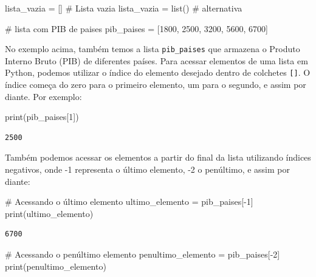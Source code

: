 \documentclass[
  portuguese,
  letterpaper,
  DIV=11,
  numbers=noendperiod]{scrreprt}
\newenvironment{Shaded}{\begin{snugshade}}{\end{snugshade}}
\newcommand{\BuiltInTok}[1]{\textcolor[rgb]{0.00,0.23,0.31}{#1}}
\newcommand{\CommentTok}[1]{\textcolor[rgb]{0.37,0.37,0.37}{#1}}
\newcommand{\DecValTok}[1]{\textcolor[rgb]{0.68,0.00,0.00}{#1}}
\newcommand{\NormalTok}[1]{\textcolor[rgb]{0.00,0.23,0.31}{#1}}
\newcommand{\OperatorTok}[1]{\textcolor[rgb]{0.37,0.37,0.37}{#1}}
\theoremstyle{definition}
\theoremstyle{remark}
\begin{document}
\begin{Shaded}
\begin{Highlighting}[]
\NormalTok{lista\_vazia }\OperatorTok{=}\NormalTok{ [] }\CommentTok{\# Lista vazia}
\NormalTok{lista\_vazia }\OperatorTok{=} \BuiltInTok{list}\NormalTok{() }\CommentTok{\# alternativa}

\CommentTok{\# lista com PIB de paises}
\NormalTok{pib\_paises }\OperatorTok{=}\NormalTok{ [}\DecValTok{1800}\NormalTok{, }\DecValTok{2500}\NormalTok{, }\DecValTok{3200}\NormalTok{, }\DecValTok{5600}\NormalTok{, }\DecValTok{6700}\NormalTok{]}
\end{Highlighting}
\end{Shaded}

No exemplo acima, também temos a lista \texttt{pib\_paises} que armazena
o Produto Interno Bruto (PIB) de diferentes países. Para acessar
elementos de uma lista em Python, podemos utilizar o índice do elemento
desejado dentro de colchetes \texttt{{[}{]}}. O índice começa do zero
para o primeiro elemento, um para o segundo, e assim por diante. Por
exemplo:

\begin{Shaded}
\begin{Highlighting}[]
\BuiltInTok{print}\NormalTok{(pib\_paises[}\DecValTok{1}\NormalTok{])}
\end{Highlighting}
\end{Shaded}

\begin{verbatim}
2500
\end{verbatim}

Também podemos acessar os elementos a partir do final da lista
utilizando índices negativos, onde -1 representa o último elemento, -2 o
penúltimo, e assim por diante:

\begin{Shaded}
\begin{Highlighting}[]
\CommentTok{\# Acessando o último elemento}
\NormalTok{ultimo\_elemento }\OperatorTok{=}\NormalTok{ pib\_paises[}\OperatorTok{{-}}\DecValTok{1}\NormalTok{]}
\BuiltInTok{print}\NormalTok{(ultimo\_elemento)}
\end{Highlighting}
\end{Shaded}

\begin{verbatim}
6700
\end{verbatim}

\begin{Shaded}
\begin{Highlighting}[]
\CommentTok{\# Acessando o penúltimo elemento}
\NormalTok{penultimo\_elemento }\OperatorTok{=}\NormalTok{ pib\_paises[}\OperatorTok{{-}}\DecValTok{2}\NormalTok{]}
\BuiltInTok{print}\NormalTok{(penultimo\_elemento)}
\end{Highlighting}
\end{Shaded}
\end{document}
